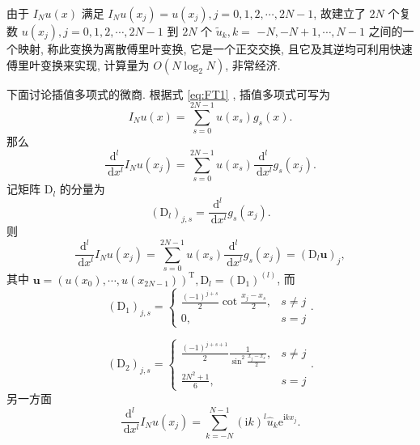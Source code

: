 由于 $I_N u(x)$ 满足 $I_N u\left(x_j\right)=u\left(x_j\right), j=0,1,2, \cdots, 2 N-1$, 故建立了 $2 N$ 个复数 $u\left(x_j\right), j=0,1,2, \cdots, 2 N-1$ 到 $2 N$ 个 $\tilde{u}_k, k=$ $-N,-N+1, \cdots, N-1$ 之间的一个映射, 
称此变换为离散傅里叶变换, 它是一个正交交换, 且它及其逆均可利用快速傅里叶变换来实现, 计算量为 $O\left(N \log _2 N\right)$, 非常经济.

下面讨论插值多项式的微商. 根据式 \eqref{eq:FT1} , 插值多项式可写为
\begin{equation}
I_N u(x)=\sum_{s=0}^{2 N-1} u\left(x_s\right) g_s(x).
\end{equation}
那么
\begin{equation}
\frac{\mathrm{d}^l}{\mathrm{~d} x^l} I_N u\left(x_j\right)=\sum_{s=0}^{2 N-1} u\left(x_s\right) \frac{\mathrm{d}^l}{\mathrm{~d} x^l} g_s\left(x_j\right).
\end{equation}
记矩阵 $\mathrm{D}_l$ 的分量为
\begin{equation}
\left(\mathrm{D}_l\right)_{j, s}=\frac{\mathrm{d}^l}{\mathrm{~d} x^l} g_s\left(x_j\right).
\end{equation}
则
\begin{equation}
\frac{\mathrm{d}^l}{\mathrm{~d} x^l} I_N u\left(x_j\right)=\sum_{s=0}^{2 N-1} u\left(x_s\right) \frac{\mathrm{d}^l}{\mathrm{~d} x^l} g_s\left(x_j\right)=\left(\mathrm{D}_l \boldsymbol{u}\right)_j,
\end{equation}
其中 $\boldsymbol{u}=\left(u\left(x_0\right), \cdots, u\left(x_{2 N-1}\right)\right)^{\mathrm{T}}, \mathrm{D}_l=\left(\mathrm{D}_1\right)^{(l)}$, 而
\begin{equation}
\left(\mathrm{D}_1\right)_{j, s}=\begin{cases}
\frac{(-1)^{j+s}}{2} \operatorname{cot} \frac{x_j-x_s}{2}, & s \neq j \\
0, & s=j
\end{cases}.
\end{equation}

\begin{equation}
    \left(\mathrm{D}_2\right)_{j, s}= \begin{cases}\frac{(-1)^{j+s+1}}{2} \frac{1}{\sin ^2 \frac{x_j-x_s}{2}}, & s \neq j \\ 
        \frac{2 N^2+1}{6}, & s=j\end{cases}.
    \end{equation}
    另一方面
    \begin{equation}
    \frac{\mathrm{d}^l}{\mathrm{~d} x^l} I_N u\left(x_j\right)=\sum_{k=-N}^{N-1}(\mathrm{i} k)^l \hat{u}_k \mathrm{e}^{\mathrm{i} k x_j}.
    \end{equation}

